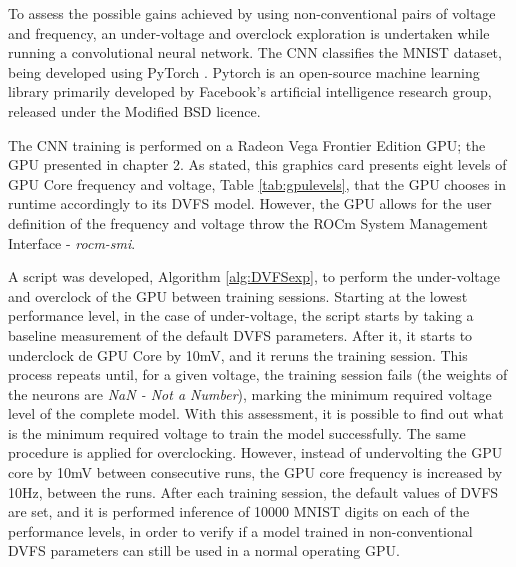 To assess the possible gains achieved by using non-conventional pairs of voltage and frequency, an under-voltage and overclock exploration is undertaken while running a convolutional neural network. The CNN classifies the MNIST dataset\cite{noauthor_mnist_nodate}, being developed using PyTorch \cite{noauthor_pytorch_nodate}. Pytorch is an open-source machine learning library primarily developed by Facebook's artificial intelligence research group, released under the Modified BSD licence.

The CNN training is performed on a Radeon Vega Frontier Edition GPU; the GPU presented in chapter 2. As stated, this graphics card presents eight levels of GPU Core frequency and voltage, Table \ref{tab:gpulevels}, that the GPU chooses in runtime accordingly to its DVFS model. However, the GPU allows for the user definition of the frequency and voltage throw the ROCm System Management Interface - \textit{rocm-smi}. 

A script was developed, Algorithm \ref{alg:DVFSexp}, to perform the under-voltage and overclock of the GPU between training sessions. Starting at the lowest performance level, in the case of under-voltage, the script starts by taking a baseline measurement of the default DVFS parameters. After it, it starts to underclock de GPU Core by 10mV, and it reruns the training session. This process repeats until, for a given voltage, the training session fails (the weights of the neurons are \textit{NaN - Not a Number}), marking the minimum required voltage level of the complete model. With this assessment, it is possible to find out what is the minimum required voltage to train the model successfully. The same procedure is applied for overclocking. However, instead of undervolting the GPU core by 10mV between consecutive runs, the GPU core frequency is increased by 10Hz, between the runs. After each training session, the default values of DVFS are set, and it is performed inference of 10000 MNIST digits on each of the performance levels, in order to verify if a model trained in non-conventional DVFS parameters can still be used in a normal operating GPU.


